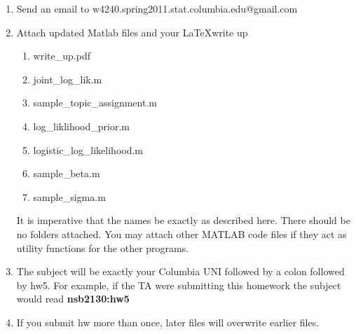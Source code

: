 \documentclass[12pt]{article}
\begin{document}
\begin{enumerate}
	\item Send an email to w4240.spring2011.stat.columbia.edu@gmail.com
	\item {Attach updated Matlab files and your \LaTeX write up 
		\begin{enumerate}
			\item write\_up.pdf
			\item joint\_log\_lik.m
			\item sample\_topic\_assignment.m
			\item log\_liklihood\_prior.m
			\item logistic\_log\_likelihood.m
			\item sample\_beta.m
			\item sample\_sigma.m
		\end{enumerate} It is imperative that the names be exactly as described here. There should be no folders attached.  You may attach other MATLAB code files if they act as utility functions for the other programs. }
	\item The subject will be exactly your Columbia UNI followed by a colon followed by hw5.  For example, if the TA were submitting this homework the subject would read {\bf nsb2130:hw5}
	\item If you submit hw more than once, later files will overwrite earlier files.
\end{enumerate}


\problemsdone
\end{document}
